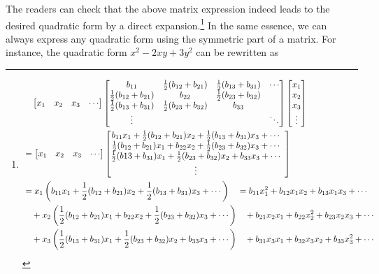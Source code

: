The readers can check that the above matrix expression indeed leads to the desired quadratic form by a direct expansion.\footnote{\begin{align*}
&\quad \begin{bmatrix}
x_1 & x_2 & x_3 & \cdots
\end{bmatrix}
\left[\begin{array}{@{}cccc@{}}
b_{11} & \frac{1}{2}(b_{12} + b_{21}) & \frac{1}{2}(b_{13} + b_{31}) & \cdots \\
\frac{1}{2}(b_{12} + b_{21}) & b_{22} & \frac{1}{2}(b_{23} + b_{32}) &  \\
\frac{1}{2}(b_{13} + b_{31}) & \frac{1}{2}(b_{23} + b_{32}) & b_{33} &  \\
\vdots & & & \ddots
\end{array}\right]
\begin{bmatrix}
x_1 \\
x_2 \\
x_3 \\
\vdots
\end{bmatrix} \\
&=
\begin{bmatrix}
x_1 & x_2 & x_3 & \cdots
\end{bmatrix}
\left[\begin{array}{@{}cccc@{}}
b_{11}x_1 + \frac{1}{2}(b_{12} + b_{21})x_2 + \frac{1}{2}(b_{13} + b_{31})x_3 + \cdots \\
\frac{1}{2}(b_{12} + b_{21})x_1 + b_{22}x_2 + \frac{1}{2}(b_{23} + b_{32})x_3 + \cdots \\
\frac{1}{2}(b{13} + b_{31})x_1 + \frac{1}{2}(b_{23} + b_{32})x_2 + b_{33}x_3 + \cdots \\
\vdots 
\end{array}\right] \\
&= x_1\left(b_{11}x_1 + \frac{1}{2}(b_{12} + b_{21})x_2 + \frac{1}{2}(b_{13} + b_{31})x_3 + \cdots\right) \quad = b_{11}x_1^2 + b_{12}x_1x_2 + b_{13}x_1x_3 + \cdots \\
&\quad + x_2\left(\frac{1}{2}(b_{12} + b_{21})x_1 + b_{22}x_2 + \frac{1}{2}(b_{23} + b_{32})x_3 + \cdots\right) \quad + b_{21}x_2x_1 + b_{22}x_2^2 + b_{23}x_2x_3 + \cdots \\
&\quad + x_3\left(\frac{1}{2}(b_{13} + b_{31})x_1 + \frac{1}{2}(b_{23} + b_{32})x_2 + b_{33}x_3 + \cdots\right) \quad + b_{31}x_3x_1 + b_{32}x_3x_2 + b_{33}x_3^2 + \cdots 
\end{align*}} In the same essence, we can always express any quadratic form using the symmetric part of a matrix. For instance, the quadratic form $x^2 - 2xy + 3y^2$ can be rewritten as

